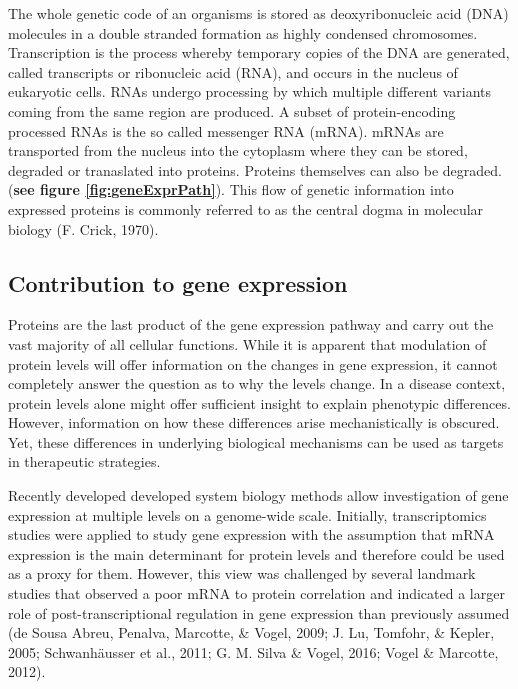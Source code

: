 \documentclass[12pt,openany]{book}
\begin{document}
The whole genetic code of an organisms is stored as deoxyribonucleic
acid (DNA) molecules in a double stranded formation as highly condensed
chromosomes. Transcription is the process whereby temporary copies of
the DNA are generated, called transcripts or ribonucleic acid (RNA), and
occurs in the nucleus of eukaryotic cells. RNAs undergo processing by
which multiple different variants coming from the same region are
produced. A subset of protein-encoding processed RNAs is the so called
messenger RNA (mRNA). mRNAs are transported from the nucleus into the
cytoplasm where they can be stored, degraded or tranaslated into
proteins. Proteins themselves can also be degraded. (\textbf{see figure
\ref{fig:geneExprPath}}). This flow of genetic information into
expressed proteins is commonly referred to as the central dogma in
molecular biology (F. Crick, 1970). \clearpage
\subsection{Contribution to gene expression} Proteins are the last
product of the gene expression pathway and carry out the vast majority
of all cellular functions. While it is apparent that modulation of
protein levels will offer information on the changes in gene expression,
it cannot completely answer the question as to why the levels change. In
a disease context, protein levels alone might offer sufficient insight
to explain phenotypic differences. However, information on how these
differences arise mechanistically is obscured. Yet, these differences in
underlying biological mechanisms can be used as targets in therapeutic
strategies.

Recently developed developed system biology methods allow investigation
of gene expression at multiple levels on a genome-wide scale. Initially,
transcriptomics studies were applied to study gene expression with the
assumption that mRNA expression is the main determinant for protein
levels and therefore could be used as a proxy for them. However, this
view was challenged by several landmark studies that observed a poor
mRNA to protein correlation and indicated a larger role of
post-transcriptional regulation in gene expression than previously
assumed (de Sousa Abreu, Penalva, Marcotte, \& Vogel, 2009; J. Lu,
Tomfohr, \& Kepler, 2005; Schwanhäusser et al., 2011; G. M. Silva \&
Vogel, 2016; Vogel \& Marcotte, 2012).
\end{document}
